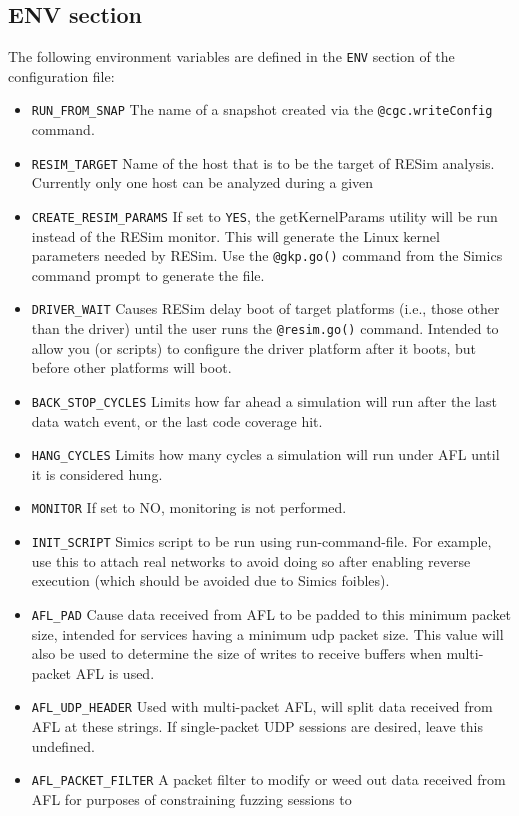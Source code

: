 \documentclass[titlepage]{article}
\begin{document}
\subsection{ENV section}
\label{env}
The following environment variables are defined in the {\tt ENV} section of the configuration file:
\begin{itemize}
\item {\tt RUN\_FROM\_SNAP} The name of a snapshot created via the {\tt @cgc.writeConfig} command.
\item {\tt RESIM\_TARGET} Name of the host that is to be the target of RESim analysis.  Currently only one host can be analyzed during a given
\item {\tt CREATE\_RESIM\_PARAMS} If set to {\tt YES}, the getKernelParams utility will be run instead of the RESim monitor.  This will
generate the Linux kernel parameters needed by RESim.  Use the {\tt @gkp.go()} command from the Simics command prompt to generate the file.
\item {\tt DRIVER\_WAIT} Causes RESim delay boot of target platforms (i.e., those other than the driver) until the 
user runs the {\tt @resim.go()} command.  Intended to allow you (or scripts)
to configure the driver platform after it boots, but before other platforms will boot.
\item {\tt BACK\_STOP\_CYCLES} Limits how far ahead a simulation will run after the last data watch event, or the last code coverage hit.
\item {\tt HANG\_CYCLES} Limits how many cycles a simulation will run under AFL until it is considered hung.
\item {\tt MONITOR} If set to NO, monitoring is not performed.
\item{\tt INIT\_SCRIPT} Simics script to be run using run-command-file.  For example, use this to attach real networks to avoid
doing so after enabling reverse execution (which should be avoided due to Simics foibles).
\item{\tt AFL\_PAD} Cause data received from AFL to be padded to this minimum packet size, intended for services having a minimum udp packet size.
This value will also be used to determine the size of writes to receive buffers when multi-packet AFL is used.
\item{\tt AFL\_UDP\_HEADER} Used with multi-packet AFL, will split data received from AFL at these strings.  If single-packet UDP sessions are desired,
leave this undefined.
\item{\tt AFL\_PACKET\_FILTER} A packet filter to modify or weed out data received from AFL for purposes of constraining fuzzing sessions to

\end{itemize}
\end{document}
